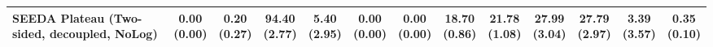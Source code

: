 \begin{table}[H]
{\begin{tabular}{l|cccccc|cccccc}
SEEDA Plateau (Two-sided, decoupled, NoLog) & \makecell{0.00 \\ (0.00)} & \makecell{0.20 \\ (0.27)} & {\cellcolor[HTML]{C8E6C9}} \bfseries \makecell{94.40 \\ (2.77)} & \makecell{5.40 \\ (2.95)} & \makecell{0.00 \\ (0.00)} & \makecell{0.00 \\ (0.00)} & \makecell{18.70 \\ (0.86)} & \makecell{21.78 \\ (1.08)} & {\cellcolor[HTML]{C8E6C9}} \bfseries \makecell{27.99 \\ (3.04)} & \makecell{27.79 \\ (2.97)} & \makecell{3.39 \\ (3.57)} & \makecell{0.35 \\ (0.10)} \\
\bottomrule
\end{tabular}
}%
\end{table}
